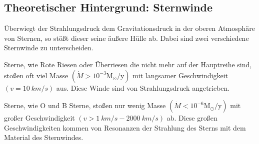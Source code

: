 \subsection{Theoretischer Hintergrund: Sternwinde}
Überwiegt der Strahlungsdruck dem Gravitationsdruck in der oberen Atmosphäre von Sternen, so stößt dieser seine äußere Hülle ab.
Dabei sind zwei verschiedene Sternwinde zu unterscheiden.

Sterne, wie Rote Riesen oder Überriesen die nicht mehr auf der Hauptreihe sind, stoßen oft viel Masse $\left(\dot{M}>10^{-3}\text{M}_\odot/\text{y}\right)$ mit langsamer Geschwindigkeit $\left(v=\SI{10}{km/s}\right)$ aus.
Diese Winde sind von Strahlungsdruck angetrieben.

Sterne, wie O und B Sterne, stoßen nur wenig Masse $\left(\dot{M}<10^{-6}\text{M}_\odot/\text{y}\right)$ mit großer Geschwindigkeit $\left(v>\SI{1}{km/s}-\SI{2000}{km/s}\right)$ ab.
Diese großen Geschwindigkeiten kommen von Resonanzen der Strahlung des Sterns mit dem Material des Sternwindes.
